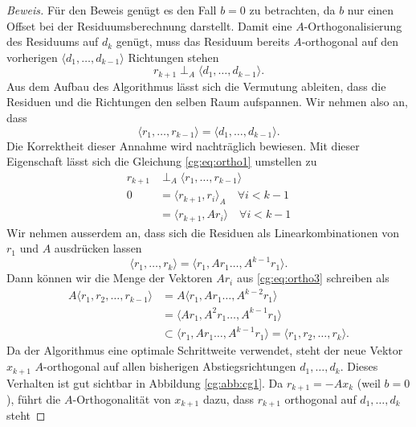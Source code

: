 \begin{proof}[Beweis]
Für den Beweis genügt es den Fall $b=0$ zu betrachten, da $b$ nur einen Offset bei der Residuumsberechnung darstellt.
Damit eine $A$-Orthogonalisierung des Residuums auf $d_k$ genügt, muss das Residuum bereits $A$-orthogonal auf den vorherigen $\langle d_1, \dots ,d_{k-1} \rangle$ Richtungen stehen
\begin{equation} \label{cg:eq:ortho1}
	r_{k+1} \perp_A \langle d_1, \dots ,d_{k-1} \rangle.
\end{equation} 
Aus dem Aufbau des Algorithmus lässt sich die Vermutung ableiten, dass die Residuen und die Richtungen den selben Raum aufspannen.
Wir nehmen also an, dass
\begin{equation}\label{cg:eq:ortho2}
\langle r_1, \dots ,r_{k-1} \rangle 
= 
\langle d_1, \dots ,d_{k-1} \rangle.
\end{equation}
Die Korrektheit dieser Annahme wird nachträglich bewiesen. 
Mit dieser Eigenschaft lässt sich die Gleichung \eqref{cg:eq:ortho1} umstellen zu
\begin{align}\label{cg:eq:ortho3}
	r_{k+1} 	&\perp_A \langle r_1, \dots ,r_{k-1} \rangle \nonumber \\
	0 			&= \langle r_{k+1}, r_i \rangle_A \quad \forall i < k-1 \nonumber\\
				&= \langle r_{k+1}, Ar_i \rangle \quad \forall i < k-1 
\end{align} 
Wir nehmen ausserdem an, dass sich die Residuen als Linearkombinationen von $r_1$ und $A$ ausdrücken lassen
\begin{equation}
	\langle r_1, \dots ,r_k \rangle = \langle r_1, Ar_1 \dots ,A^{k-1}r_1 \rangle.
\end{equation}
Dann können wir die Menge der Vektoren $Ar_i$ aus \eqref{cg:eq:ortho3} schreiben als
\begin{align}\label{cg:eq:ortho4}
	A \langle r_1, r_2, \dots , r_{k-1} \rangle &= A \langle r_1, Ar_1 \dots ,A^{k-2}r_1 \rangle \nonumber\\
												&= \langle Ar_1, A^2r_1 \dots ,A^{k-1}r_1 \rangle \nonumber\\
												&\subset \langle r_1, Ar_1 \dots ,A^{k-1}r_1 \rangle = \langle r_1, r_2, \dots , r_k \rangle.
\end{align} 
Da der Algorithmus eine optimale Schrittweite verwendet, steht der neue Vektor $x_{k+1}$ $A$-orthogonal auf allen bisherigen Abstiegsrichtungen $d_1, \dots, d_k$.
Dieses Verhalten ist gut sichtbar in Abbildung \ref{cg:abb:cg1}.
Da $r_{k+1} = -Ax_k$ (weil $b=0$), führt die $A$-Orthogonalität von $x_{k+1}$ dazu, dass $r_{k+1}$ orthogonal auf $d_1, \dots, d_k$ steht

\end{proof}
